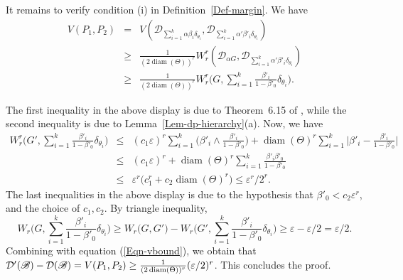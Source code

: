 \documentclass[MSNbibl,number,citesort]{arxbj}
\newcommand{\eqref}[1]{(\ref{#1})}
\def\comment{}
\newcommand{\Dcal}{\mathcal{D}}
\newcommand{\BB}{\mathscr{B}}
\newcommand{\Diam}{\operatorname{diam}}
\newcommand{\supp}{\operatorname{spt}}
\newcommand{\DP}{\mathscr{D}}
\newcommand{\Wr}{W_r}
\newcommand{\vecq}{\mathbf{q}}
\begin{document}
\begin{pf}

It remains to verify
condition (i) in Definition~\ref{Def-margin}. We have
%
%
\begin{eqnarray}\label{Eqn-vbound}
V(P_1,P_2) & = & V(\DP_{\sum_{i=1}^{k}\alpha\beta_i \delta_{\theta_i}},
\DP_{\sum_{i=1}^{k}\alpha' \beta'_i \delta_{\theta_i}})
\nonumber
\\
& \geq& \frac{1}{(2\operatorname{diam}(\Theta))^r} \Wr^r(\DP _{\alpha G},
\DP_{\sum_{i=1}^{k}\alpha' \beta'_i \delta_{\theta_i}})
\\
 & \geq&
\frac{1}{(2\operatorname{diam}(\Theta))^r} \Wr^r \Biggl(G, \sum_{i=1}^{k}
\frac{\beta'_i}{1-\beta'_0} \delta_{\theta_i} \Biggr).\nonumber
\end{eqnarray}

The first inequality in the above display is due to
Theorem~6.15 of \cite{Villani-08}, %
while the second inequality is due to Lemma~\ref{Lem-dp-hierarchy}(a).
Now, we have
%
\begin{eqnarray*}
\Wr^r \Biggl(G', \sum_{i=1}^{k}
\frac{\beta'_i}{1-\beta'_0} \delta_{\theta_i} \Biggr) & \leq& (c_1
\varepsilon)^r \sum_{i=1}^{k}
\biggl(\beta'_i \wedge\frac
{\beta
'_i}{1-\beta'_0} \biggr) +
\Diam( \Theta)^r \sum_{i=1}^{k}
\biggl| \beta'_i - \frac{\beta
'_i}{1-\beta'_0} \biggr|
\\
& \leq& (c_1\varepsilon)^r + \Diam(\Theta)^r
\sum_{i=1}^{k}\frac
{\beta'_i
\beta'_0}{1-\beta'_0}
\\
& \leq& \varepsilon^r \bigl(c_1^r +
c_2 \Diam(\Theta)^r \bigr) \leq\varepsilon^r/2^r.
\end{eqnarray*}
%
The last inequalities in the above display
is due to the hypothesis that $\beta'_0 < c_2\varepsilon^r$, and the
choice of $c_1,c_2$.
By triangle inequality,
%
\[
\Wr \Biggl(G, \sum_{i=1}^{k}
\frac{\beta'_i}{1-\beta'_0} \delta_{\theta_i} \Biggr) \geq\Wr \bigl(G,G'
\bigr) - \Wr \Biggl(G', \sum_{i=1}^{k}
\frac{\beta'_i}{1-\beta'_0} \delta_{\theta_i} \Biggr) \geq \varepsilon- \varepsilon/2
= \varepsilon/2.
\]
%
Combining with equation \eqref{Eqn-vbound},
we obtain that $\Dcal'(\BB) - \Dcal(\BB) =
V(P_1,P_2) \geq\break \frac{1}{(2\operatorname{diam}(\Theta))^r}
(\varepsilon/2)^r$.
This concludes the proof.
\end{pf}
\end{document}

